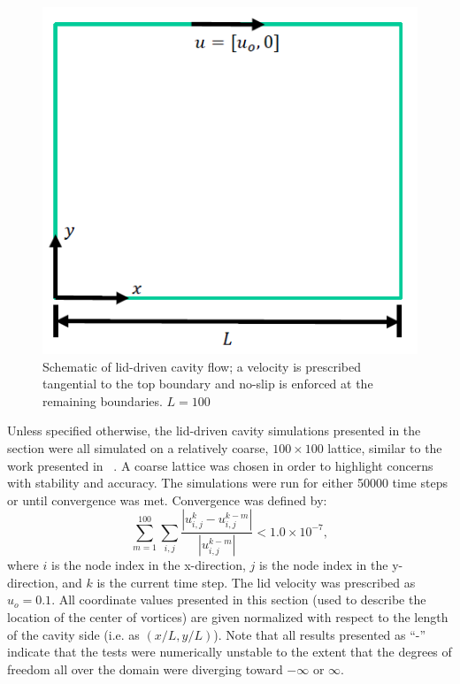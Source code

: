 \begin{figure}
\centering
\includegraphics{figs/lid-driven}
\caption{Schematic of lid-driven cavity flow; a velocity is prescribed tangential to the top boundary and no-slip is enforced at the remaining boundaries. $L = 100$}
\label{fig:lid-driven}
\end{figure}

Unless specified otherwise, the lid-driven cavity simulations presented in the section were all simulated on a relatively coarse, $100 \times 100$ lattice, similar to the work presented in ~\cite{brownlee2008nonequilibrium}.
A coarse lattice was chosen in order to highlight concerns with stability and accuracy.
The simulations were run for either 50000 time steps or until convergence was met.
Convergence was defined by:
\begin{equation} \label{eq:convergence}
\sum_{m=1}^{100} \sum_{i, j} \frac{|u_{i, j}^k - u_{i, j}^{k-m}|}{|u_{i, j}^{k-m}|} < 1.0 \times 10^{-7},
\end{equation}
\noindent where $i$ is the node index in the x-direction, $j$ is the node index in the y-direction, and $k$ is the current time step.
The lid velocity was prescribed as $u_o = 0.1$\DIFaddbegin {}\DIFaddend .
All coordinate values presented in this section (used to describe the location of the center of vortices) are given normalized with respect to the length of the cavity side (i.e. as $(x / L, y / L)$).
Note that all results presented as ``-'' indicate that the tests were numerically unstable to the extent that the degrees of freedom all over the domain were diverging toward $-\infty$ or $\infty$.

